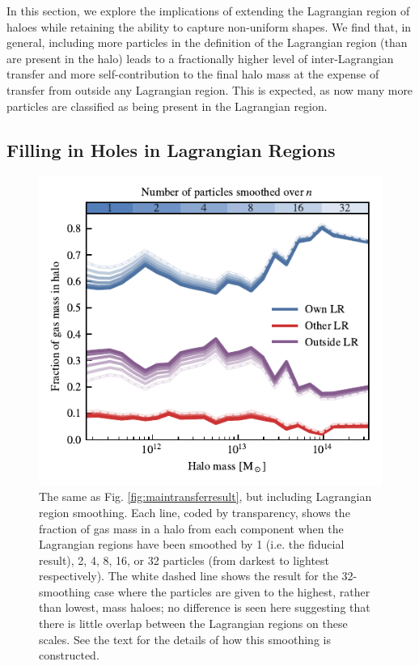 \documentclass[fleqn,usenatbib]{mnras}
\begin{document}
In this section, we explore the implications of extending the Lagrangian
region of haloes while retaining the ability to capture non-uniform shapes. We
find that, in general, including more particles in the definition of the Lagrangian
region (than are present in the halo) leads to a fractionally higher level
of inter-Lagrangian transfer and more self-contribution to the final halo mass
at the expense of transfer from outside any Lagrangian region. This is expected, as
now many more particles are classified as being present in the Lagrangian region.


\subsection{Filling in Holes in Lagrangian Regions}


\begin{figure}
	\centering
	\includegraphics{figures/convergence_smoothing.pdf}
	\vspace{-0.7cm}
 \caption{The same as Fig. \ref{fig:maintransferresult}, but including
 Lagrangian region smoothing. Each line, coded by transparency, shows the
 fraction of gas mass in a halo from each component when the Lagrangian
 regions have been smoothed by 1 (i.e. the fiducial result), 2, 4, 8, 16, or
 32 particles (from darkest to lightest respectively). The white dashed line
 shows the result for the 32-smoothing case where the particles are given to
 the highest, rather than lowest, mass haloes; no difference is seen here
 suggesting that there is little overlap between the Lagrangian regions on
 these scales. See the text for the details of how this smoothing is
 constructed.}
	\label{fig:smoothconv}
\end{figure}
\end{document}
